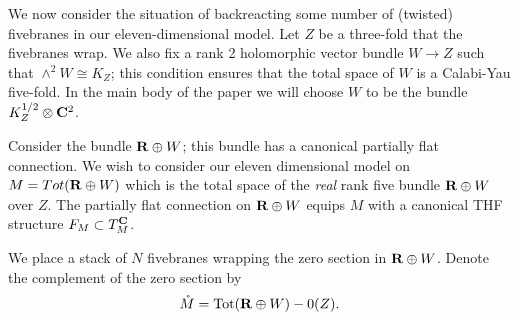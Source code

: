 \parsec[s:brfive]

We now consider the situation of backreacting some number of (twisted) fivebranes in our eleven-dimensional model.
Let $Z$ be a three-fold that the fivebranes wrap.
We also fix a rank 2 holomorphic vector bundle $W\to Z$ such that $\wedge^{2} W \cong K_{Z}$;
this condition ensures that the total space of $W$ is a Calabi-Yau five-fold. In the main body of the paper we will choose $W$ to be the bundle $K_{Z}^{1/2}\otimes \mathbf{C}^{2}$.

Consider the bundle $\mathbf{R}\oplus W$; this bundle has a canonical partially flat connection. We wish to consider our eleven dimensional model on $M = Tot (\mathbf{R}\oplus W)$ which is the total space of the \textit{real} rank five bundle $\mathbf{R}\oplus W$ over $Z$. The partially flat connection on $\mathbf{R}\oplus W$ equips $M$ with a canonical THF structure $F_{M}\subset T_{M}^{\mathbf{C}}$.

We place a stack of $N$ fivebranes wrapping the zero section in $\mathbf{R}\oplus W$.
Denote the complement of the zero section by
\[
\mathring{M} = \text{Tot}(\mathbf{R}\oplus W) - 0(Z).
\]




